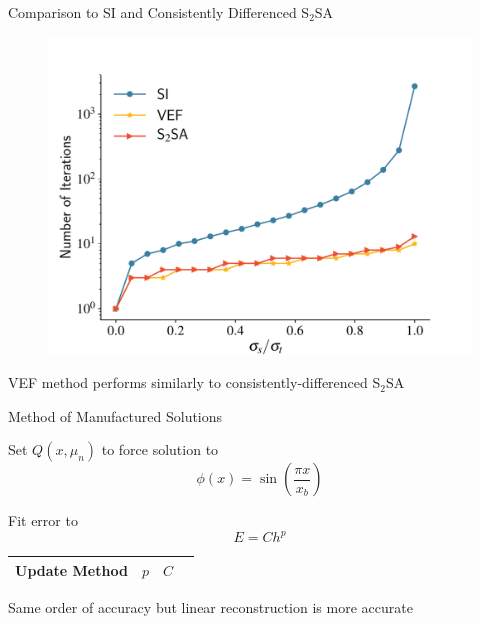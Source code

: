 \documentclass[10pt]{beamer}
\begin{document}
\begin{frame}{Comparison to SI and Consistently Differenced S$_2$SA}

	\begin{figure}[htb]
		\centering
		\includegraphics[width=.75\textwidth]{figs/si_vef_s2sa.pdf} 
		\label{fig:si_vef_s2sa}
	\end{figure}

	\begin{block}{}
		\centerline{VEF method performs similarly to consistently-differenced S$_2$SA}
	\end{block}

\end{frame}

\begin{frame}{Method of Manufactured Solutions}

	Set $Q(x, \mu_n)$ to force solution to 
	\begin{equation*}
		\phi(x) = \sin\left(\frac{\pi x}{x_b}\right)
	\end{equation*}

	Fit error to 
	\begin{equation*}
		E = C h^p 
	\end{equation*}

	\begin{table}[htb]
	\centering
	\begin{tabular}{|c|c|c|c|}
	\hline
	Update Method & $p$ & $C$ \\ 
	\hline
		
	\hline
	\end{tabular}
	\label{tab:mms}
	\end{table}

	\pause 
	\begin{block}{}
		\centering Same order of accuracy but linear reconstruction is more accurate 
	\end{block}

\end{frame}
\end{document}
